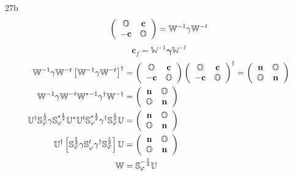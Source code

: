 \documentclass[aps,preprint]{revtex4}%
\begin{document}
27b%
\[
\left(
\begin{array}
[c]{cc}%
\mathbb{O} & \mathbf{c}\\
-\mathbf{c} & \mathbb{O}%
\end{array}
\right)  =\mathbb{W}^{-1}\mathbf{\gamma}\mathbb{W}^{-t}%
\]%
\[
\mathbf{c}_{f}=\mathbb{W}^{-1}\mathbf{\gamma}\mathbb{W}^{-t}%
\]%
\begin{align*}
\mathbb{W}^{-1}\mathbf{\gamma}\mathbb{W}^{-t}\left[  \mathbb{W}^{-1}%
\mathbf{\gamma}\mathbb{W}^{-t}\right]  ^{\dagger}  &  =\left(
\begin{array}
[c]{cc}%
\mathbb{O} & \mathbf{c}\\
-\mathbf{c} & \mathbb{O}%
\end{array}
\right)  \left(
\begin{array}
[c]{cc}%
\mathbb{O} & \mathbf{c}\\
-\mathbf{c} & \mathbb{O}%
\end{array}
\right)  ^{\dagger}=\left(
\begin{array}
[c]{cc}%
\mathbf{n} & \mathbb{O}\\
\mathbb{O} & \mathbf{n}%
\end{array}
\right) \\
\mathbb{W}^{-1}\mathbf{\gamma}\mathbb{W}^{-t}\mathbb{W}^{\ast-1}%
\mathbf{\gamma}^{\dagger}\mathbb{W}^{-\dagger}  &  =\left(
\begin{array}
[c]{cc}%
\mathbf{n} & \mathbb{O}\\
\mathbb{O} & \mathbf{n}%
\end{array}
\right) \\
\mathbb{U}^{\dagger}\mathbb{S}_{\varphi}^{\frac{1}{2}}\mathbf{\gamma
}\mathbb{S}_{\varphi}^{\ast\frac{1}{2}}\mathbb{U}^{\ast}\mathbb{U}%
^{t}\mathbb{S}_{\varphi}^{\ast\frac{1}{2}}\mathbf{\gamma}^{\dagger}%
\mathbb{S}_{\varphi}^{\frac{1}{2}}\mathbb{U}  &  =\left(
\begin{array}
[c]{cc}%
\mathbf{n} & \mathbb{O}\\
\mathbb{O} & \mathbf{n}%
\end{array}
\right) \\
\mathbb{U}^{\dagger}\left[  \mathbb{S}_{\varphi}^{\frac{1}{2}}\mathbf{\gamma
}\mathbb{S}_{\varphi}^{t}\mathbf{\gamma}^{\dagger}\mathbb{S}_{\varphi}%
^{\frac{1}{2}}\right]  \mathbb{U}  &  =\left(
\begin{array}
[c]{cc}%
\mathbf{n} & \mathbb{O}\\
\mathbb{O} & \mathbf{n}%
\end{array}
\right) \\
\mathbb{W}  &  =\mathbb{S}_{\varphi}^{-\frac{1}{2}}\mathbb{U}%
\end{align*}
\end{document}
